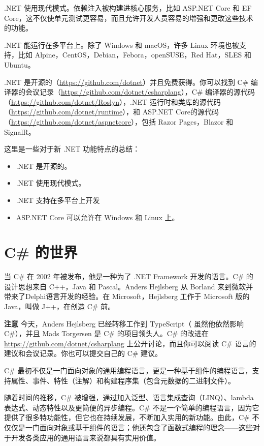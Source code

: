 .NET 使用现代模式。依赖注入被构建进核心服务，比如 ASP.NET Core 和 EF Core，这不仅使单元测试更容易，而且允许开发人员容易的增强和更改这些技术的功能。

.NET 能运行在多平台上。除了 Windows 和 macOS，许多 Linux 环境也被支持，比如 Alpine，CentOS，Debian，Febora，openSUSE，Red Hat，SLES 和 Ubuntu。

.NET 是开源的（\url{https://github.com/dotnet}）并且免费获得。你可以找到 C\# 编译器的会议记录（\url{https://github.com/dotnet/csharplang}），C\# 编译器的源代码（\url{https://github.com/dotnet/Roslyn}），.NET 运行时和类库的源代码（\url{https://github.com/dotnet/runtime}），和 ASP.NET Core的源代码（\url{https://github.com/dotnet/aspnetcore}），包括 Razor Pages，Blazor 和 SignalR。

这里是一些对于新 .NET 功能特点的总结：
\begin{itemize}
    \item .NET 是开源的。
    \item .NET 使用现代模式。
    \item .NET 支持在多平台上开发
    \item ASP.NET Core 可以允许在 Windows 和 Linux 上。
\end{itemize}

\section*{C\# 的世界}
当 C\# 在 2002 年被发布，他是一种为了 .NET Framework 开发的语言。C\# 的设计思想来自 C++，Java 和 Pascal。Anders Hejlsberg 从 Borland 来到微软并带来了Delphi语言开发的经验。在 Microsoft，Hejlsberg 工作于 Microsoft 版的 Java，叫做 J++，在创造 C\# 前。

\begin{framed}
\textbf{注意} 今天，Anders Hejlsberg 已经转移工作到 TypeScript（ 虽然他依然影响 C\#），并且 Mads Torgersen 是 C\# 的项目领头人。C\# 的改进在 \url{https://github.com/dotnet/csharplang} 上公开讨论，而且你可以阅读 C\# 语言的建议和会议记录。你也可以提交自己的 C\# 建议。
\end{framed}

C\# 最初不仅是一门面向对象的通用编程语言，更是一种基于组件的编程语言，支持属性、事件、特性（注解）和构建程序集（包含元数据的二进制文件）。

随着时间的推移，C\# 被增强，通过加入泛型、语言集成查询（LINQ）、lambda 表达式、动态特性以及更简便的异步编程。C\# 不是一个简单的编程语言，因为它提供了很多特功能性，但它也在持续发展，不断加入实用的新功能。由此，C\# 不仅仅是一门面向对象或基于组件的语言；他还包含了函数式编程的理念——这些对于开发各类应用的通用语言来说都具有实用价值。

